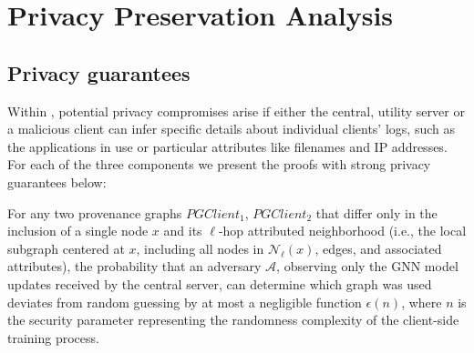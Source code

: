 \section{Privacy Preservation Analysis}
\label{sec:privacy}

\subsection{Privacy guarantees}

Within \Sys, potential privacy compromises arise if either the central, utility server or a malicious client can infer specific details about individual clients' logs, such as the applications in use or particular attributes like filenames and IP addresses. For each of the three components we present the proofs with strong privacy guarantees below:

\renewcommand{\thetheorem}{\arabic{theorem}}

\begin{theorem}
    For any two provenance graphs \(PGClient_1\), \(PGClient_2\) that differ only in the inclusion of a single node \(x\) and its \(\ell\)-hop attributed neighborhood (i.e., the local subgraph centered at \(x\), including all nodes in \(\mathcal{N}_\ell(x)\), edges, and associated attributes), the probability that an adversary \(\mathcal{A}\), observing only the GNN model updates received by the central server, can determine which graph was used deviates from random guessing by at most a negligible function \(\epsilon(n)\), where \(n\) is the security parameter representing the randomness complexity of the client-side training process.
    \end{theorem}
    
